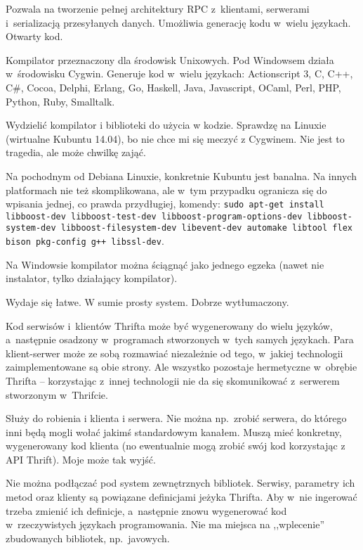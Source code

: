 \begin{description}
Pozwala na tworzenie pełnej architektury RPC z~klientami, serwerami i~serializacją przesyłanych danych. Umożliwia generację kodu w~wielu językach. Otwarty kod. 

Kompilator przeznaczony dla środowisk Unixowych. Pod Windowsem działa w~środowisku Cygwin.
Generuje kod w~wielu językach: Actionscript 3, C, C++, C\#, Cocoa, Delphi, Erlang, Go, Haskell, Java, Javascript, OCaml, Perl, PHP, Python, Ruby, Smalltalk\cite{thrift-features}.

Wydzielić kompilator i biblioteki do użycia w kodzie.
Sprawdzę na Linuxie (wirtualne Kubuntu 14.04), bo nie chce mi się meczyć z Cygwinem. Nie jest to tragedia, ale może chwilkę zająć.

Na pochodnym od Debiana Linuxie, konkretnie Kubuntu jest banalna. Na innych platformach nie też skomplikowana, ale w~tym przypadku ogranicza się do wpisania jednej, co prawda przydługiej, komendy: \texttt{sudo apt-get install libboost-dev libboost-test-dev libboost-program-options-dev libboost-system-dev libboost-filesystem-dev libevent-dev automake libtool flex bison pkg-config g++ libssl-dev}.

Na Windowsie kompilator można ściągnąć jako jednego egzeka (nawet nie instalator, tylko działający kompilator).

Wydaje się łatwe. W sumie prosty system. Dobrze wytłumaczony.

Kod serwisów i~klientów Thrifta może być wygenerowany do wielu języków, a~następnie osadzony w~programach stworzonych w~tych samych językach.
Para klient-serwer może ze sobą rozmawiać niezależnie od tego, w~jakiej technologii zaimplementowane są obie strony.
Ale wszystko pozostaje hermetyczne w~obrębie Thrifta -- korzystając z~innej technologii nie da się skomunikować z~serwerem stworzonym w~Thrifcie.

Służy do robienia i klienta i serwera. Nie można np.\ zrobić serwera, do którego inni będą mogli wołać jakimś standardowym kanałem. Muszą mieć konkretny, wygenerowany kod klienta (no ewentualnie mogą zrobić swój kod korzystając z API Thrift). Moje może tak wyjść.

Nie można podłączać pod system zewnętrznych bibliotek. Serwisy, parametry ich metod oraz klienty są powiązane definicjami jeżyka Thrifta. Aby w~nie ingerować trzeba zmienić ich definicje, a~następnie znowu wygenerować kod w~rzeczywistych językach programowania. Nie ma miejsca na ,,wplecenie'' zbudowanych bibliotek, np.\ javowych.


\end{description}
